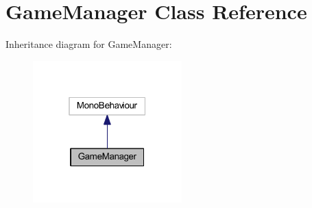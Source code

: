 \hypertarget{class_game_manager}{}\section{Game\+Manager Class Reference}
\label{class_game_manager}


Inheritance diagram for Game\+Manager\+:
\nopagebreak
\begin{figure}[H]
\begin{center}
\leavevmode
\includegraphics[width=163pt]{class_game_manager__inherit__graph}
\end{center}
\end{figure}
